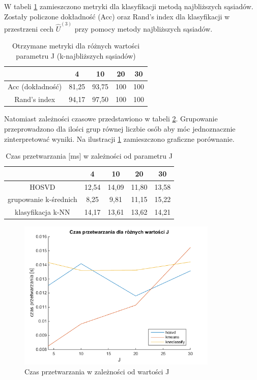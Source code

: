 \documentclass[11pt, a4paper]{article}
\begin{document}
W tabeli \ref{tab:wynikiKnn} zamieszczono metryki dla klasyfikacji metodą najbliższych sąsiadów. Zostały policzone dokładność (Acc) oraz Rand's index dla klasyfikacji w przestrzeni cech $\widehat{U}^{(3)}$ przy pomocy metody najbliższych sąsiadów.

\begin{table}[H]
	\centering
	\caption{Otrzymane metryki dla różnych wartości parametru J (k-najbliższych sąsiadów)}
	\begin{tabular}{|c|c|c|c|c|}
		\hline 
		& 4 & 10 & 20 & 30 \\ 
		\hline
		Acc (dokładność) & 81,25 & 93,75 & 100 & 100 \\
		\hline
		Rand's index & 94,17 & 97,50 & 100 & 100 \\
		\hline
	\end{tabular}
	\label{tab:wynikiKnn}
\end{table}

Natomiast zależności czasowe przedstawiono w tabeli \ref{tab:wynikiCzas}. Grupowanie przeprowadzono dla ilości grup równej liczbie osób aby móc jednoznacznie zinterpretować wyniki. Na ilustracji \ref{fig:wykres_zad3_czas} zamieszczono graficzne porównanie.

\begin{table}[H]
	\centering
	\caption{Czas przetwarzania [ms] w zależności od parametru J}
	\begin{tabular}{|c|c|c|c|c|}
		\hline 
		& 4 & 10 & 20 & 30 \\ 
		\hline
		HOSVD & 12,54 & 14,09 & 11,80 & 13,58 \\
		\hline
		grupowanie k-średnich & 8,25 & 9,81 & 11,15 & 15,22 \\
		\hline
		klasyfikacja k-NN & 14,17 & 13,61 & 13,62 & 14,21 \\
		\hline
	\end{tabular}
	\label{tab:wynikiCzas}
\end{table}

\begin{figure}[H]
	\centering
	\includegraphics[width=0.85\textwidth]{./assets/wykres_zad3_czas.png}
	\caption{Czas przetwarzania w zależności od wartości J}
	\label{fig:wykres_zad3_czas}
\end{figure}
\end{document}

